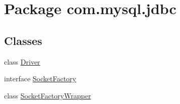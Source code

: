 \hypertarget{namespacecom_1_1mysql_1_1jdbc}{}\section{Package com.\+mysql.\+jdbc}
\label{namespacecom_1_1mysql_1_1jdbc}
\subsection*{Classes}
\begin{DoxyCompactItemize}
\item 
class \mbox{\hyperlink{classcom_1_1mysql_1_1jdbc_1_1_driver}{Driver}}
\item 
interface \mbox{\hyperlink{interfacecom_1_1mysql_1_1jdbc_1_1_socket_factory}{Socket\+Factory}}
\item 
class \mbox{\hyperlink{classcom_1_1mysql_1_1jdbc_1_1_socket_factory_wrapper}{Socket\+Factory\+Wrapper}}
\end{DoxyCompactItemize}
